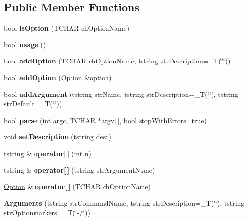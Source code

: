 \subsection*{Public Member Functions}
\begin{DoxyCompactItemize}
\item 
\mbox{\label{classArguments_a606a2390080ac2130bb04a9625b262f9}} 
bool {\bfseries is\+Option} (T\+C\+H\+AR ch\+Option\+Name)
\item 
\mbox{\label{classArguments_a255619dfd905699c2736d80b53e34e0a}} 
bool {\bfseries usage} ()
\item 
\mbox{\label{classArguments_a52ee036641dc209e97bf1a0915f771f2}} 
bool {\bfseries add\+Option} (T\+C\+H\+AR ch\+Option\+Name, tstring str\+Description=\+\_\+T(\char`\"{}\char`\"{}))
\item 
\mbox{\label{classArguments_a8cc8b5468b0c6f8da482df2fd5aa89f3}} 
bool {\bfseries add\+Option} (\hyperlink{classArguments_1_1Option}{Option} \&\hyperlink{structoption}{option})
\item 
\mbox{\label{classArguments_a220d65e34c94f3ac46c8a228b0617a9c}} 
bool {\bfseries add\+Argument} (tstring str\+Name, tstring str\+Description=\+\_\+T(\char`\"{}\char`\"{}), tstring str\+Default=\+\_\+T(\char`\"{}\char`\"{}))
\item 
\mbox{\label{classArguments_a4896d0a63a43b8eeba25167989341a33}} 
bool {\bfseries parse} (int argc, T\+C\+H\+AR $\ast$argv\mbox{[}$\,$\mbox{]}, bool stop\+With\+Errors=true)
\item 
\mbox{\label{classArguments_a2fa3a4276b81ede1b9d7fb48d3b1e6fe}} 
void {\bfseries set\+Description} (tstring desc)
\item 
\mbox{\label{classArguments_a5be695c6c17e6bbce1167ed87503b383}} 
tstring \& {\bfseries operator\mbox{[}$\,$\mbox{]}} (int n)
\item 
\mbox{\label{classArguments_a922f926f2b10c121a3edd31f02917270}} 
tstring \& {\bfseries operator\mbox{[}$\,$\mbox{]}} (tstring str\+Argument\+Name)
\item 
\mbox{\label{classArguments_a9e4cd695fcc69931382edaa2d345b04e}} 
\hyperlink{classArguments_1_1Option}{Option} \& {\bfseries operator\mbox{[}$\,$\mbox{]}} (T\+C\+H\+AR ch\+Option\+Name)
\item 
\mbox{\label{classArguments_aded5ead61dda27d46587d4ca59c7a27e}} 
{\bfseries Arguments} (tstring str\+Command\+Name, tstring str\+Description=\+\_\+T(\char`\"{}\char`\"{}), tstring str\+Optionmarkers=\+\_\+T(\char`\"{}-\//\char`\"{}))
\end{DoxyCompactItemize}
